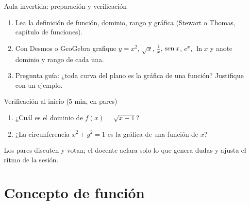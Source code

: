 \documentclass[10pt,aspectratio=169]{beamer}
\begin{document}
\begin{frame}{Aula invertida: preparación y verificación}
  \small
  \begin{previa}
    \begin{enumerate}
      \item Lea la definición de función, dominio, rango y gráfica (Stewart o Thomas, capítulo de funciones).
      \item Con Desmos o GeoGebra grafique $y=x^2$, $\sqrt x$, $\frac1x$, $\operatorname{sen} x$, $e^x$, $\ln x$ y anote dominio y rango de cada una.
      \item Pregunta guía: ¿toda curva del plano es la gráfica de una función? Justifique con un ejemplo.
    \end{enumerate}
  \end{previa}
  \begin{block}{Verificación al inicio (5 min, en pares)}
    \begin{enumerate}
      \item ¿Cuál es el dominio de $f(x)=\sqrt{x-1}$?
      \item ¿La circunferencia $x^2+y^2=1$ es la gráfica de una función de $x$?
    \end{enumerate}
    Los pares discuten y votan; el docente aclara solo lo que genera dudas y ajusta el ritmo de la sesión.
  \end{block}
\end{frame}

\section{Concepto de función}
\end{document}
